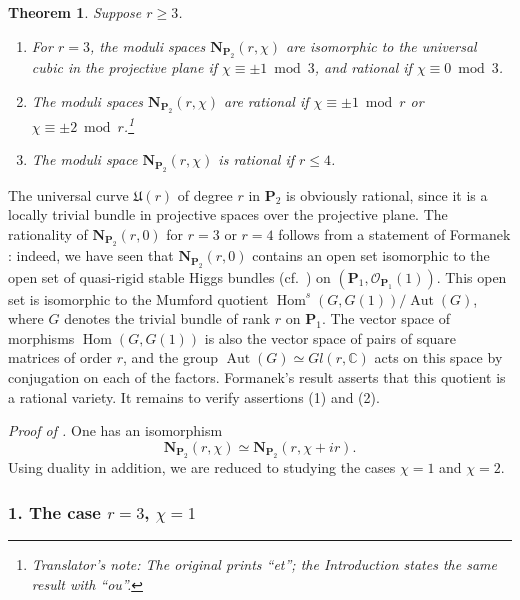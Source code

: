 \documentclass[12pt,english]{smfart}%
\theoremstyle{plain}
\newtheorem{theorem}{Theorem}[section]
\theoremstyle{definition}
\theoremstyle{remark}
\newcommand{\PP}{\mathbf{P}}
\newcommand{\NN}{\mathbf{N}}           %
\newcommand{\CC}{\mathbb{C}}
\newcommand{\Oo}{\mathcal{O}}
\DeclareMathOperator{\Hom}{Hom}
\DeclareMathOperator{\Aut}{Aut}
\newcommand{\origpage}[1]{\marginnote{\scriptsize\itshape p.~#1}}
\newcommand{\tnote}[1]{\footnote{\emph{Translator's note}: #1}}
\begin{document}
\begin{theorem}\label{thm:rational}
Suppose $r\ge 3$.
\begin{enumerate}
\item[(1)] For $r=3$, the moduli spaces $\NN_{\PP_2}(r,\chi)$ are isomorphic to the universal cubic in the projective plane if $\chi \equiv \pm 1 \bmod 3$, and rational if $\chi\equiv 0\bmod 3$.
\item[(2)] The moduli spaces $\NN_{\PP_2}(r,\chi)$ are rational if $\chi\equiv\pm 1\bmod r$ or $\chi\equiv \pm 2 \bmod r$.\tnote{The original prints ``et''; the Introduction states the same result with ``ou''.}
\item[(3)] The moduli space $\NN_{\PP_2}(r,\chi)$ is rational if $r\le 4$.
\end{enumerate}
\end{theorem}

The universal curve $\mathfrak{U}(r)$ of degree $r$ in $\PP_2$ is obviously rational, since it is a locally trivial bundle in projective spaces over the projective plane. The rationality of $\NN_{\PP_2}(r,0)$ for $r=3$ or $r=4$ follows from a statement of Formanek \cite{For}: indeed, we have seen that $\NN_{\PP_2}(r,0)$ contains an open set isomorphic to the open set of quasi-rigid stable Higgs bundles (cf.\ ) on $(\PP_1,\Oo_{\PP_1}(1))$. This open set is isomorphic to the Mumford quotient $\Hom^s(G,G(1))/\Aut(G)$, where $G$ denotes the trivial bundle of rank $r$ on $\PP_1$. The vector space of morphisms $\Hom(G,G(1))$ is also the vector space of pairs of square matrices of order $r$, and the group
\origpage{671}%
$\Aut(G)\simeq Gl(r,\CC)$ acts on this space by conjugation on each of the factors. Formanek's result asserts that this quotient is a rational variety. It remains to verify assertions (1) and (2).

\medskip
\noindent\emph{Proof of .} One has an isomorphism
\[
\NN_{\PP_2}(r,\chi)\simeq \NN_{\PP_2}(r,\chi+ir).
\]
Using duality in addition, we are reduced to studying the cases $\chi=1$ and $\chi=2$.

\subsubsection*{1. The case $r=3$, $\chi=1$}
\end{document}
